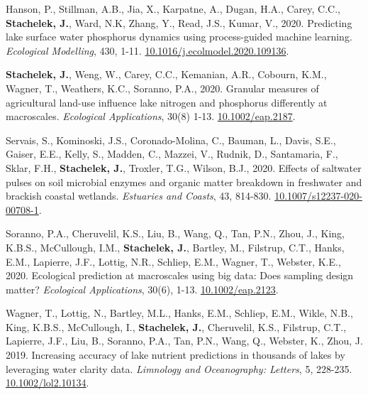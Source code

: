 \documentclass[11pt]{article}
\makeatletter
\newlength{\bibhang}
\newlength{\bibsep}
 {\@listi \global\bibsep\itemsep \global\advance\bibsep by\parsep}
\newenvironment{bibenum*}
  {\renewcommand\labelenumi{[\theenumi]}%
   \etaremune[
     topsep=0pt,
     itemsep=\bibsep,
     parsep=0pt,partopsep=0pt,
     itemindent=-\bibhang,
     leftmargin=0.8em
     ]
     }
  {\endetaremune}
\makeatother
\begin{document}
\begin{bibenum*}

    \item Hanson, P., Stillman, A.B., Jia, X., Karpatne, A., Dugan, H.A., Carey, C.C., \textbf{Stachelek, J.}, Ward, N.K, Zhang, Y., Read, J.S., Kumar, V., 2020. Predicting lake surface water phosphorus dynamics using process-guided machine learning. \emph{Ecological Modelling}, 430, 1-11. \href{https://doi.org/10.1016/j.ecolmodel.2020.109136}{10.1016/j.ecolmodel.2020.109136}.

    \item \textbf{Stachelek, J.}, Weng, W., Carey, C.C., Kemanian, A.R., Cobourn, K.M., Wagner, T., Weathers, K.C., Soranno, P.A., 2020. Granular measures of agricultural land-use influence lake nitrogen and phosphorus differently at macroscales. \emph{Ecological Applications}, 30(8) 1-13. \href{https://doi.org/10.1002/eap.2187}{10.1002/eap.2187}.

    \item Servais, S., Kominoski, J.S., Coronado-Molina, C., Bauman, L., Davis, S.E., Gaiser, E.E., Kelly, S., Madden, C., Mazzei, V., Rudnik, D., Santamaria, F., Sklar, F.H., \textbf{Stachelek, J.}, Troxler, T.G., Wilson, B.J., 2020. Effects of saltwater pulses on soil microbial enzymes and organic matter breakdown in freshwater and brackish coastal wetlands. \emph{Estuaries and Coasts}, 43, 814-830. \href{https://doi.org/10.1007/s12237-020-00708-1}{10.1007/s12237-020-00708-1}.

    \item Soranno, P.A., Cheruvelil, K.S., Liu, B., Wang, Q., Tan, P.N., Zhou, J., King, K.B.S., McCullough, I.M., \textbf{Stachelek, J.}, Bartley, M., Filstrup, C.T., Hanks, E.M., Lapierre, J.F., Lottig, N.R., Schliep, E.M., Wagner, T., Webster, K.E., 2020. Ecological prediction at macroscales using big data: Does sampling design matter? \emph{Ecological Applications}, 30(6), 1-13. \href{https://doi.org/10.1002/eap.2123}{10.1002/eap.2123}.

    \item Wagner, T., Lottig, N., Bartley, M.L., Hanks, E.M., Schliep, E.M., Wikle, N.B., King, K.B.S., McCullough, I., \textbf{Stachelek, J.}, Cheruvelil, K.S., Filstrup, C.T., Lapierre, J.F., Liu, B., Soranno, P.A., Tan, P.N., Wang, Q., Webster, K.,  Zhou, J. 2019. Increasing accuracy of lake nutrient predictions in thousands of lakes by leveraging water clarity data. \emph{Limnology and Oceanography: Letters}, 5, 228-235. \href{https://doi.org/10.1002/lol2.10134}{10.1002/lol2.10134}.


\end{bibenum*}
\end{document}
